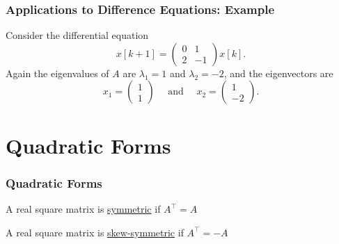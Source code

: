 \documentclass{beamer}
\begin{document}
\begin{frame}\frametitle{Applications to Difference Equations: Example}


	Consider the differential equation
	\[
		x[k+1] 
			= \begin{pmatrix}
	    		0 & 1\\
	    		2 & -1
	  		  \end{pmatrix} x[k].
	\]
	Again the eigenvalues of $A$ are $\lambda_1 = 1$ and $\lambda_2 = -2$, and the eigenvectors are
	\[ 
		x_1 = \begin{pmatrix} 1 \\ 1 \end{pmatrix} 
		\quad \text{ and } \quad
		x_2 =  \begin{pmatrix} 1 \\ -2 \end{pmatrix}.
	\]
		
\end{frame}


\section{Quadratic Forms}
\frame{\sectionpage}

\begin{frame}\frametitle{Quadratic Forms}
	\begin{definition}
		A real square matrix is \underline{symmetric} if $A^\top =A$	
	\end{definition}
	
	\begin{definition}
		A real square matrix is \underline{skew-symmetric} if $A^\top  = -A$
	\end{definition}
\end{frame}
\end{document}
